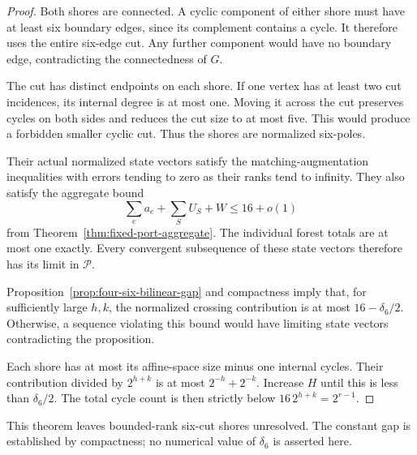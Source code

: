 \begin{proof}
Both shores are connected.
A cyclic component of either shore must have at least six boundary edges, since its complement contains a cycle.
It therefore uses the entire six-edge cut.
Any further component would have no boundary edge, contradicting the connectedness of $G$.

The cut has distinct endpoints on each shore.
If one vertex has at least two cut incidences, its internal degree is at most one.
Moving it across the cut preserves cycles on both sides and reduces the cut size to at most five.
This would produce a forbidden smaller cyclic cut.
Thus the shores are normalized six-poles.

Their actual normalized state vectors satisfy the matching-augmentation inequalities with errors tending to zero as their ranks tend to infinity.
They also satisfy the aggregate bound
\[
 \sum_ea_e+\sum_SU_S+W\le16+o(1)
\]
from Theorem~\ref{thm:fixed-port-aggregate}.
The individual forest totals are at most one exactly.
Every convergent subsequence of these state vectors therefore has its limit in $\mathcal P$.

Proposition~\ref{prop:four-six-bilinear-gap} and compactness imply that, for sufficiently large $h,k$, the normalized crossing contribution is at most $16-\delta_6/2$.
Otherwise, a sequence violating this bound would have limiting state vectors contradicting the proposition.

Each shore has at most its affine-space size minus one internal cycles.
Their contribution divided by $2^{h+k}$ is at most $2^{-h}+2^{-k}$.
Increase $H$ until this is less than $\delta_6/2$.
The total cycle count is then strictly below $16\,2^{h+k}=2^{r-1}$.
\end{proof}

This theorem leaves bounded-rank six-cut shores unresolved.
The constant gap is established by compactness; no numerical value of $\delta_6$ is asserted here.
